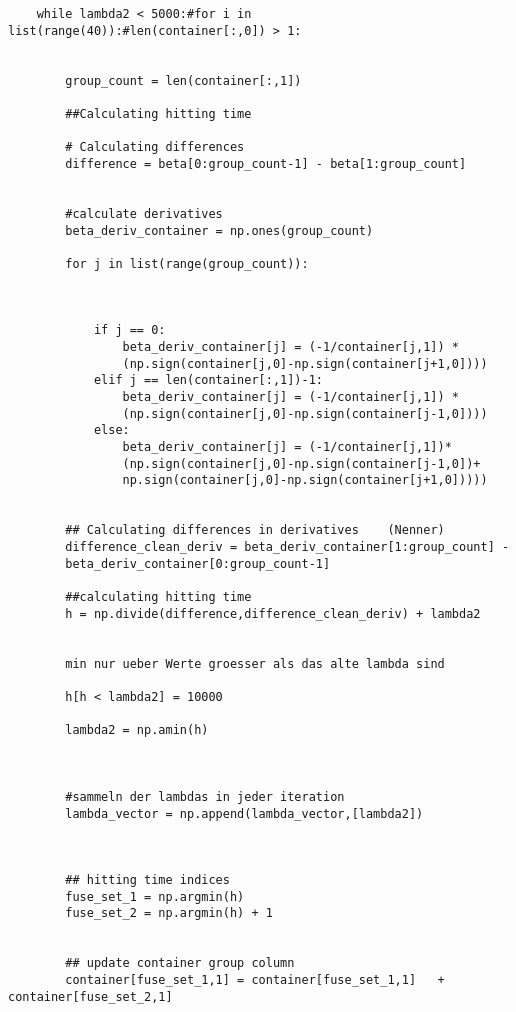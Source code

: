 \documentclass{article}
\theoremstyle{definition}
\begin{document}
\begin{lstlisting}
    while lambda2 < 5000:#for i in list(range(40)):#len(container[:,0]) > 1:
    
        
        group_count = len(container[:,1])
        
        ##Calculating hitting time
        
        # Calculating differences
        difference = beta[0:group_count-1] - beta[1:group_count]
        
        
        #calculate derivatives
        beta_deriv_container = np.ones(group_count)
        
        for j in list(range(group_count)):
            
            
            
            if j == 0:
                beta_deriv_container[j] = (-1/container[j,1]) * 
                (np.sign(container[j,0]-np.sign(container[j+1,0])))
            elif j == len(container[:,1])-1:
                beta_deriv_container[j] = (-1/container[j,1]) * 
                (np.sign(container[j,0]-np.sign(container[j-1,0])))
            else:
                beta_deriv_container[j] = (-1/container[j,1])* 
                (np.sign(container[j,0]-np.sign(container[j-1,0])+ 
                np.sign(container[j,0]-np.sign(container[j+1,0]))))
         
            
        ## Calculating differences in derivatives    (Nenner)
        difference_clean_deriv = beta_deriv_container[1:group_count] - 
        beta_deriv_container[0:group_count-1]
        
        ##calculating hitting time
        h = np.divide(difference,difference_clean_deriv) + lambda2
        
        
        min nur ueber Werte groesser als das alte lambda sind
        
        h[h < lambda2] = 10000
        
        lambda2 = np.amin(h)
        
        
        
        #sammeln der lambdas in jeder iteration
        lambda_vector = np.append(lambda_vector,[lambda2])
        
        
        
        ## hitting time indices
        fuse_set_1 = np.argmin(h)
        fuse_set_2 = np.argmin(h) + 1
        
        
        ## update container group column
        container[fuse_set_1,1] = container[fuse_set_1,1]   + container[fuse_set_2,1]
        

\end{lstlisting}
\end{document}
